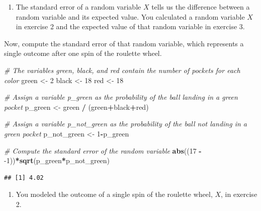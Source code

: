 \documentclass[
]{article}
\newenvironment{Shaded}{\begin{snugshade}}{\end{snugshade}}
\newcommand{\CommentTok}[1]{\textcolor[rgb]{0.56,0.35,0.01}{\textit{#1}}}
\newcommand{\DecValTok}[1]{\textcolor[rgb]{0.00,0.00,0.81}{#1}}
\newcommand{\KeywordTok}[1]{\textcolor[rgb]{0.13,0.29,0.53}{\textbf{#1}}}
\newcommand{\NormalTok}[1]{#1}
\newcommand{\OperatorTok}[1]{\textcolor[rgb]{0.81,0.36,0.00}{\textbf{#1}}}
\newcommand{\StringTok}[1]{\textcolor[rgb]{0.31,0.60,0.02}{#1}}
\providecommand{\tightlist}{%
  \setlength{\itemsep}{0pt}\setlength{\parskip}{0pt}}
\begin{document}
\begin{enumerate}
\def\labelenumi{\arabic{enumi}.}
\setcounter{enumi}{3}
\tightlist
\item
  The standard error of a random variable \(X\) tells us the difference
  between a random variable and its expected value. You calculated a
  random variable \(X\) in exercise 2 and the expected value of that
  random variable in exercise 3.
\end{enumerate}

Now, compute the standard error of that random variable, which
represents a single outcome after one spin of the roulette wheel.

\begin{Shaded}
\begin{Highlighting}[]
\CommentTok{\# The variables \textquotesingle{}green\textquotesingle{}, \textquotesingle{}black\textquotesingle{}, and \textquotesingle{}red\textquotesingle{} contain the number of pockets for each color}
\NormalTok{green \textless{}{-}}\StringTok{ }\DecValTok{2}
\NormalTok{black \textless{}{-}}\StringTok{ }\DecValTok{18}
\NormalTok{red \textless{}{-}}\StringTok{ }\DecValTok{18}

\CommentTok{\# Assign a variable \textasciigrave{}p\_green\textasciigrave{} as the probability of the ball landing in a green pocket}
\NormalTok{p\_green \textless{}{-}}\StringTok{ }\NormalTok{green }\OperatorTok{/}\StringTok{ }\NormalTok{(green}\OperatorTok{+}\NormalTok{black}\OperatorTok{+}\NormalTok{red)}

\CommentTok{\# Assign a variable \textasciigrave{}p\_not\_green\textasciigrave{} as the probability of the ball not landing in a green pocket}
\NormalTok{p\_not\_green \textless{}{-}}\StringTok{ }\DecValTok{1}\OperatorTok{{-}}\NormalTok{p\_green}

\CommentTok{\# Compute the standard error of the random variable}
\KeywordTok{abs}\NormalTok{((}\DecValTok{17} \OperatorTok{{-}}\StringTok{ }\DecValTok{{-}1}\NormalTok{))}\OperatorTok{*}\KeywordTok{sqrt}\NormalTok{(p\_green}\OperatorTok{*}\NormalTok{p\_not\_green)}
\end{Highlighting}
\end{Shaded}

\begin{verbatim}
## [1] 4.02
\end{verbatim}

\begin{enumerate}
\def\labelenumi{\arabic{enumi}.}
\setcounter{enumi}{4}
\tightlist
\item
  You modeled the outcome of a single spin of the roulette wheel, \(X\),
  in exercise 2.
\end{enumerate}
\end{document}
